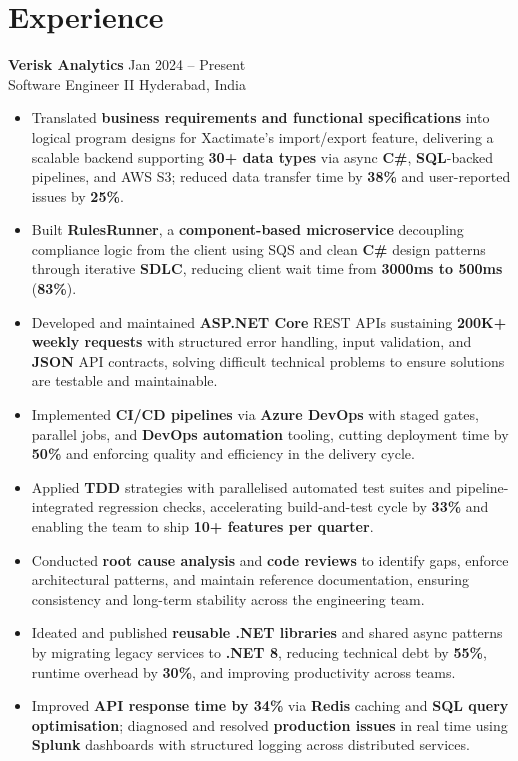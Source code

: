 \documentclass[10pt,letterpaper]{article}
\newcommand{\resumeSubheading}[4]{%
  \textbf{#1} \hfill #2 \\
  #3 \hfill #4 \\
}
\begin{document}
\section*{Experience}
\resumeSubheading{Verisk Analytics}{Jan 2024 -- Present}{Software Engineer II}{Hyderabad, India}
\begin{itemize}
    \item Translated \textbf{business requirements and functional specifications} into logical program designs for Xactimate's import/export feature, delivering a scalable backend supporting \textbf{30+ data types} via async \textbf{C\#}, \textbf{SQL}-backed pipelines, and AWS S3; reduced data transfer time by \textbf{38\%} and user-reported issues by \textbf{25\%}.
    \item Built \textbf{RulesRunner}, a \textbf{component-based microservice} decoupling compliance logic from the client using SQS and clean \textbf{C\#} design patterns through iterative \textbf{SDLC}, reducing client wait time from \textbf{3000ms to 500ms} (\textbf{83\%}).
    \item Developed and maintained \textbf{ASP.NET Core} REST APIs sustaining \textbf{200K+ weekly requests} with structured error handling, input validation, and \textbf{JSON} API contracts, solving difficult technical problems to ensure solutions are testable and maintainable.
    \item Implemented \textbf{CI/CD pipelines} via \textbf{Azure DevOps} with staged gates, parallel jobs, and \textbf{DevOps automation} tooling, cutting deployment time by \textbf{50\%} and enforcing quality and efficiency in the delivery cycle.
    \item Applied \textbf{TDD} strategies with parallelised automated test suites and pipeline-integrated regression checks, accelerating build-and-test cycle by \textbf{33\%} and enabling the team to ship \textbf{10+ features per quarter}.
    \item Conducted \textbf{root cause analysis} and \textbf{code reviews} to identify gaps, enforce architectural patterns, and maintain reference documentation, ensuring consistency and long-term stability across the engineering team.
    \item Ideated and published \textbf{reusable .NET libraries} and shared async patterns by migrating legacy services to \textbf{.NET 8}, reducing technical debt by \textbf{55\%}, runtime overhead by \textbf{30\%}, and improving productivity across teams.
    \item Improved \textbf{API response time by 34\%} via \textbf{Redis} caching and \textbf{SQL query optimisation}; diagnosed and resolved \textbf{production issues} in real time using \textbf{Splunk} dashboards with structured logging across distributed services.
\end{itemize}
\end{document}
